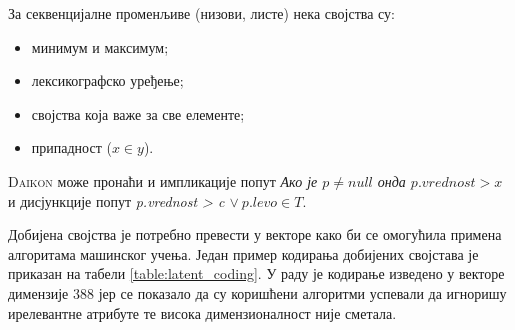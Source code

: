 \documentclass[a4paper]{article}
\begin{document}
{За секвенцијалне променљиве (низови, листе) нека својства су:
\begin{itemize}
    \item минимум и максимум;
    \item лексикографско уређење;
    \item својства која важе за све елементе;
    \item припадност ($x \in y$).
\end{itemize}

\textsc{Daikon} може пронаћи и импликације попут \textit{Ако је $p \neq null$ онда $p.vrednost > x$}
и дисјункције попут \textit{p.vrednost > c $\lor \ p.levo \in T$}.

Добијена својства је потребно превести у векторе како би се омогућила примена алгоритама машинског учења.
Један пример кодирања добијених својстава је приказан на табели \ref{table:latent_coding}.
У раду је кодирање изведено у векторе димензије 388 јер се показало да су коришћени алгоритми
успевали да игноришу ирелевантне атрибуте те висока димензионалност није сметала.


}
\end{document}
